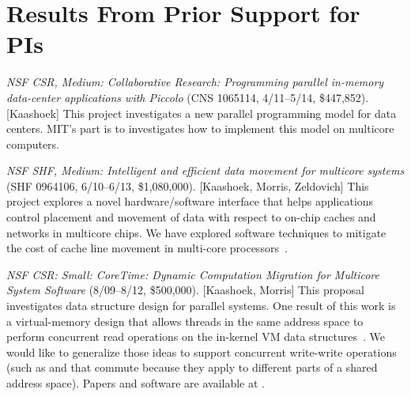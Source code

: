 % 
% 
% 
% 
% 
% 

\section{Results From Prior Support for PIs}
\label{sec:prior}

\textit{NSF CSR, Medium: Collaborative Research: Programming parallel in-memory
  data-center applications with Piccolo} (CNS 1065114, 4/11--5/14,
\$447,852).
[Kaashoek]
This project investigates a new parallel programming model for data
centers. MIT's part is to investigates how to implement this model on multicore
computers.

\textit{NSF SHF, Medium: Intelligent and efficient data movement for
  multicore systems} (SHF 0964106, 6/10--6/13, \$1,080,000).
[Kaashoek, Morris, Zeldovich]
This
project explores a novel hardware/software interface that helps
applications control placement and movement of data with respect to
on-chip caches and networks in multicore chips.  We have explored
software techniques to mitigate the cost of cache line movement in
multi-core processors~\cite{pesterev:dprof, pesterev:multiaccept,
metreveli:cphash-poster}.

\textit{NSF CSR: Small: CoreTime: Dynamic Computation Migration for Multicore
  System Software} (8/09--8/12, \$500,000).
[Kaashoek, Morris]
This proposal investigates data
structure design for parallel systems.  One result of this work is a
virtual-memory design that allows threads in the same address space to perform
concurrent read operations on the in-kernel VM data
structures~\cite{clements:bonsai}.  We would like to generalize those ideas to
support concurrent write-write operations (such as  and 
that commute because they apply to different parts of a shared address space).
Papers and software are available at .

